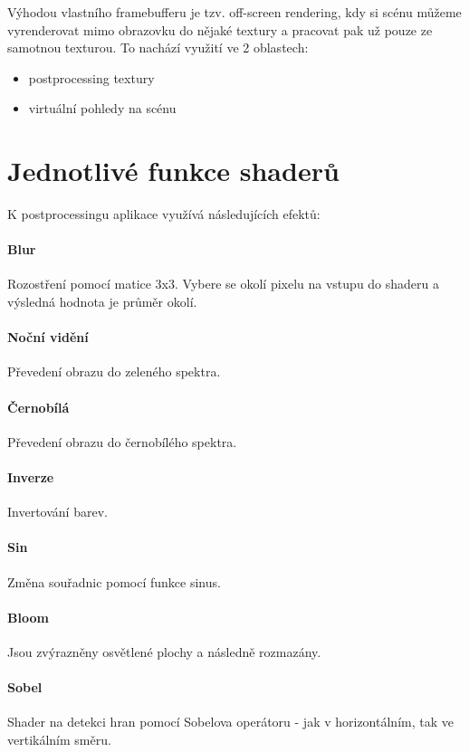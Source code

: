 \documentclass[12pt,a4paper,titlepage,final]{report}
\begin{document}
Výhodou vlastního framebufferu je tzv. off-screen rendering, kdy si scénu můžeme vyrenderovat mimo obrazovku do nějaké textury a pracovat pak už pouze ze samotnou texturou. To nachází využití ve 2 oblastech:
\begin{itemize}
	\item postprocessing textury
	\item virtuální pohledy na scénu
\end{itemize}


\section{Jednotlivé funkce shaderů}

K postprocessingu aplikace využívá následujících efektů:

\paragraph{Blur} Rozostření pomocí matice 3x3. Vybere se okolí pixelu na vstupu do shaderu a výsledná hodnota je průměr okolí.

\paragraph{Noční vidění} Převedení obrazu do zeleného spektra.

\paragraph{Černobílá} Převedení obrazu do černobílého spektra.

\paragraph{Inverze} Invertování barev.

\paragraph{Sin} Změna souřadnic pomocí funkce sinus.

\paragraph{Bloom} Jsou zvýrazněny osvětlené plochy a následně rozmazány.

\paragraph{Sobel} Shader na detekci hran pomocí Sobelova operátoru - jak v horizontálním, tak ve vertikálním směru.
\end{document}
